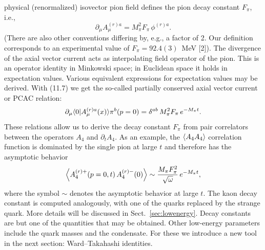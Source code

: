 physical (renormalized) isovector pion field defines the pion decay constant
$F_\pi$, i.e.,
\begin{equation}
\partial_\mu A_\mu^{(r)a} = M_\pi^2 F_\pi\, \phi^{(r)a} .
\end{equation}
(There are also other conventions differing by, e.g., a factor of 2. Our definition corresponds to an experimental value of $F_\pi = 92.4(3)$~MeV [2]). The
divergence of the axial vector current acts as interpolating field operator of
the pion. This is an operator identity in Minkowski space; in Euclidean space
it holds in expectation values.
Various equivalent expressions for expectation values may be derived. With
(11.7) we get the so-called partially conserved axial vector current or PCAC
relation:
\begin{equation}
\partial_\mu \langle0|A_\mu^{(r)a}(x)\rangle{\pi^b(p = 0)} = \delta^{ab}\, M_\pi^2 F_\pi\, e^{-M_\pi t} .
\end{equation}
These relations allow us to derive the decay constant $F_\pi$ from pair correlators between the operators $A_4$ and $\partial_t A_4$. As an example, the
$\left\langle A_4 A_4 \right\rangle$ correlation function is dominated by the single pion at large $t$ and therefore
has the asymptotic behavior
\begin{equation}
\left\langle A_4^{(r)+}(p = 0, t)\, A_4^{(r)-}(0) \right\rangle \sim \frac{M_\pi F_\pi^2}{\sqrt{\omega}}\, e^{-M_\pi t} ,
\end{equation}
where the symbol $\sim$ denotes the asymptotic behavior at large $t$. The kaon
decay constant is computed analogously, with one of the quarks replaced by
the strange quark. More details will be discussed in Sect.~\ref{sec:lowenergy}.
Decay constants are but one of the quantities that may be obtained. Other
low-energy parameters include the quark masses and the condensate. For these
we introduce a new tool in the next section: Ward--Takahashi identities.


